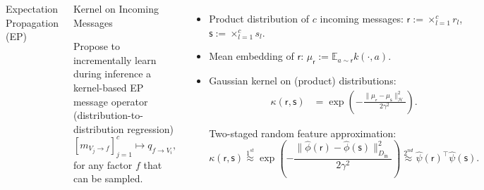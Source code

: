 \documentclass[english]{beamer}
\begin{document}
\begin{frame}
\begin{columns}[t]
\begin{block}{Expectation Propagation (EP)}


%
\end{block}

\begin{block}{Kernel on Incoming Messages}

Propose to incrementally learn during inference a kernel-based EP message operator 
(distribution-to-distribution regression) 
%
\begin{equation*}
    \left[ m_{V_j \rightarrow f}  \right]_{j=1}^c \mapsto q_{f \rightarrow V_i},
\end{equation*}
%
for any factor $f$ that can be sampled. 

\end{block}



\begin{itemize}
    \item Product distribution of $c$ incoming messages: 
        $\mathsf{r}:=\times_{l=1}^c r_{l}$, \hspace{5mm}
        $\mathsf{s}:=\times_{l=1}^c s_{l}$.     
    
    \item Mean embedding of $\mathsf{r}$:
        $\mu_{\mathsf{r}}:=\mathbb{E}_{a \sim \mathsf{r}}k(\cdot,a)$.

    \item Gaussian kernel on (product) distributions: 
        \begin{align*}
            \kappa(\mathsf{r}, \mathsf{s}) &= 
            \exp\left(-\frac{\|\mu_{\mathsf{r}}-\mu_{\mathsf{s}}\|_{\mathcal{H}}^{2}}{2\gamma^{2}}\right). 
        \end{align*}

Two-staged random feature approximation:
\begin{equation*}
    \kappa(\mathsf{r},
    \mathsf{s}) \stackrel{1^{st}}{\approx}\exp\left(-\frac{
        \|\hat{\phi}(\mathsf{r})-\hat{\phi}(\mathsf{s})\|_{D_\mathrm{in}}^{2}}{2\gamma^{2}}\right)
        \stackrel{2^{nd}}{\approx}
        \hat{\psi}(\mathsf{r})^\top \hat{\psi}(\mathsf{s}).
    \end{equation*}


\end{itemize}
\end{columns}
\end{frame}
\end{document}
